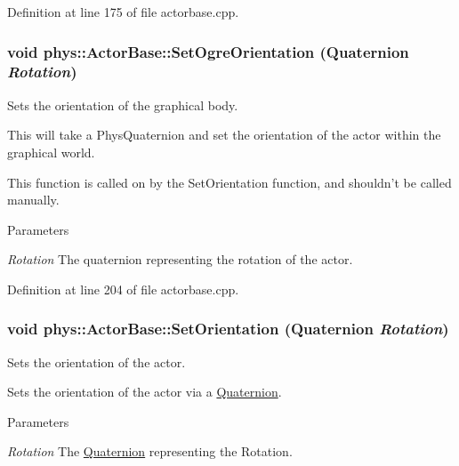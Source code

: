 Definition at line 175 of file actorbase.cpp.

\hypertarget{classphys_1_1ActorBase_a7b2d13cb1e8bba60eeae782a53fd5e49}{
\subsubsection[{SetOgreOrientation}]{\setlength{\rightskip}{0pt plus 5cm}void phys::ActorBase::SetOgreOrientation ({\bf Quaternion} {\em Rotation})}}
\label{d8/d0f/classphys_1_1ActorBase_a7b2d13cb1e8bba60eeae782a53fd5e49}


Sets the orientation of the graphical body. 

This will take a PhysQuaternion and set the orientation of the actor within the graphical world. \par
 This function is called on by the SetOrientation function, and shouldn't be called manually. 
\begin{DoxyParams}{Parameters}
\item[{\em Rotation}]The quaternion representing the rotation of the actor. \end{DoxyParams}


Definition at line 204 of file actorbase.cpp.

\hypertarget{classphys_1_1ActorBase_ac4b0bf1eff730d94f72d04957efea69d}{
\subsubsection[{SetOrientation}]{\setlength{\rightskip}{0pt plus 5cm}void phys::ActorBase::SetOrientation ({\bf Quaternion} {\em Rotation})}}
\label{d8/d0f/classphys_1_1ActorBase_ac4b0bf1eff730d94f72d04957efea69d}


Sets the orientation of the actor. 

Sets the orientation of the actor via a \hyperlink{classphys_1_1Quaternion}{Quaternion}. 
\begin{DoxyParams}{Parameters}
\item[{\em Rotation}]The \hyperlink{classphys_1_1Quaternion}{Quaternion} representing the Rotation. \end{DoxyParams}


